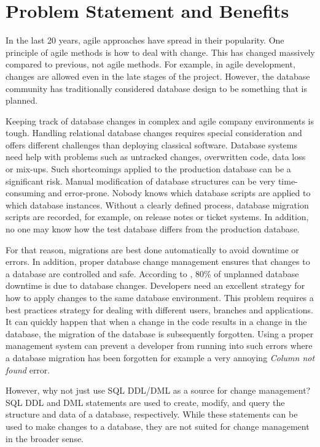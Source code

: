 \section{Problem Statement and Benefits}%
 In the last 20 years, agile approaches have spread in their popularity. One principle of agile methods is how to deal with change. This has changed massively compared to previous, not agile methods. For example, in agile development, changes are allowed even in the late stages of the project. However, the database community has traditionally considered database design to be something that is planned.
 
Keeping track of database changes in complex and agile company environments is tough. Handling relational database changes requires special consideration and offers different challenges than deploying classical software. Database systems need help with problems such as untracked changes, overwritten code, data loss or mix-ups. Such shortcomings applied to the production database can be a significant risk. Manual modification of database structures can be very time-consuming and error-prone. Nobody knows which database scripts are applied to which database instances. 
Without a clearly defined process, database migration scripts are recorded, for example, on release notes or ticket systems.
In addition, no one may know how the test database differs from the production database.
 
For that reason, migrations are best done automatically to avoid downtime or errors. In addition, proper database change management ensures that changes to a database are controlled and safe. According to \cite{ManageForce2016}, 80\% of unplanned database downtime is due to database changes.
Developers need an excellent strategy for how to apply changes to the same database environment.
This problem requires a best practices strategy for dealing with different users, branches and applications. It can quickly happen that when a change in the code results in a change in the database, the migration of the database is subsequently forgotten. Using a proper management system can prevent a developer from running into such errors where a database migration has been forgotten for example a very annoying \textit{Column not found} error.

%
However, why not just use SQL \gls{DDL}/\gls{DML} as a source for change management? SQL DDL and DML statements are used to create, modify, and query the structure and data of a database, respectively. While these statements can be used to make changes to a database, they are not suited for change management in the broader sense.

